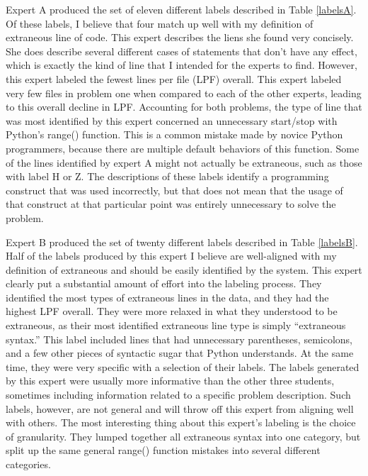 \documentclass[draft]{article}
\begin{document}


Expert A produced the set of eleven different labels described in Table \ref{labelsA}. Of these labels, I believe that four match up well with my definition of extraneous line of code. This expert describes the liens she found very concisely. She does describe several different cases of statements that don't have any effect, which is exactly the kind of line that I intended for the experts to find. However, this expert labeled the fewest lines per file (LPF) overall. This expert labeled very few files in problem one when compared to each of the other experts, leading to this overall decline in LPF. Accounting for both problems, the type of line that was most identified by this expert concerned an unnecessary start/stop with Python's range() function. This is a common mistake made by novice Python programmers, because there are multiple default behaviors of this function. Some of the lines identified by expert A might not actually be extraneous, such as those with label H or Z. The descriptions of these labels identify a programming construct that was used incorrectly, but that does not mean that the usage of that construct at that particular point was entirely unnecessary to solve the problem. 

Expert B produced the set of twenty different labels described in Table \ref{labelsB}. Half of the labels produced by this expert I believe are well-aligned with my definition of extraneous and should be easily identified by the system. This expert clearly put a substantial amount of effort into the labeling process. They identified the most types of extraneous lines in the data, and they had the highest LPF overall. They were more relaxed in what they understood to be extraneous, as their most identified extraneous line type is simply ``extraneous syntax.'' This label included lines that had unnecessary parentheses, semicolons, and a few other pieces of syntactic sugar that Python understands. At the same time, they were very specific with a selection of their labels. The labels generated by this expert were usually more informative than the other three students, sometimes including information related to a specific problem description. Such labels, however, are not general and will throw off this expert from aligning well with others. The most interesting thing about this expert's labeling is the choice of granularity. They lumped together all extraneous syntax into one category, but split up the same general range() function mistakes into several different categories. 
\end{document}
